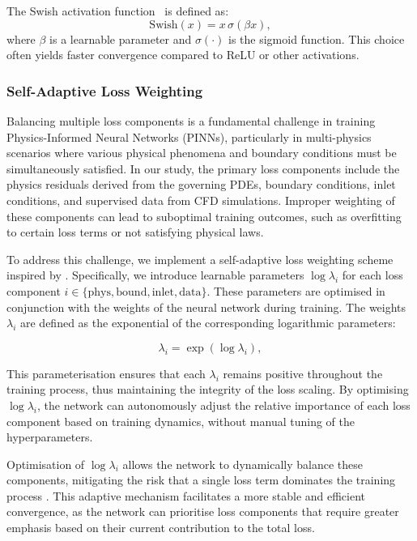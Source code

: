 \documentclass{article}
\begin{document}
The Swish activation function~\cite{ramachandran2017searching} is defined as:
\begin{equation}
\mathrm{Swish}(x) = x \,\sigma(\beta x),
\end{equation}
where $\beta$ is a learnable parameter and $\sigma(\cdot)$ is the sigmoid function. This choice often yields faster convergence compared to ReLU or other activations.

\subsubsection{Self-Adaptive Loss Weighting}
\label{sec:self_adaptive_weighting}

Balancing multiple loss components is a fundamental challenge in training Physics-Informed Neural Networks (PINNs), particularly in multi-physics scenarios where various physical phenomena and boundary conditions must be simultaneously satisfied. In our study, the primary loss components include the physics residuals derived from the governing PDEs, boundary conditions, inlet conditions, and supervised data from CFD simulations. Improper weighting of these components can lead to suboptimal training outcomes, such as overfitting to certain loss terms or not satisfying physical laws.

To address this challenge, we implement a self-adaptive loss weighting scheme inspired by \citet{mcclenny2020self}. Specifically, we introduce learnable parameters $\log \lambda_i$ for each loss component $i \in \{\mathrm{phys}, \mathrm{bound}, \mathrm{inlet}, \mathrm{data}\}$. These parameters are optimised in conjunction with the weights of the neural network during training. The weights $\lambda_i$ are defined as the exponential of the corresponding logarithmic parameters:

\begin{equation}
    \lambda_i = \exp(\log \lambda_i),
    \label{eq:lambda_definition}
\end{equation}

This parameterisation ensures that each $\lambda_i$ remains positive throughout the training process, thus maintaining the integrity of the loss scaling. By optimising $\log \lambda_i$, the network can autonomously adjust the relative importance of each loss component based on training dynamics, without manual tuning of the hyperparameters. 

Optimisation of $\log \lambda_i$ allows the network to dynamically balance these components, mitigating the risk that a single loss term dominates the training process \citep{wang2022and}. This adaptive mechanism facilitates a more stable and efficient convergence, as the network can prioritise loss components that require greater emphasis based on their current contribution to the total loss.
\end{document}
